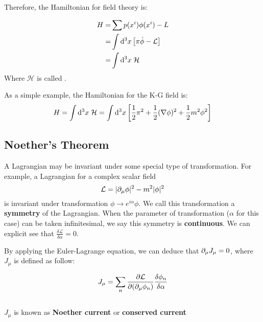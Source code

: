\documentclass[../QFTCS_note.tex]{subfiles}
\numberwithin{equation}{subsection}
\begin{document}
Therefore, the Hamiltonian for field theory is:
\begin{definition}[Hamiltonian]
  \begin{align*}
    H= & \sum p(x^i)\phi(x^i)-L                             \\
    =  & \int \mathrm{d}^3x\left[\pi \dot{\phi}-\mathcal{L}\right] \\
    =  & \int \mathrm{d}^3x\;\mathcal{H}
  \end{align*}
  Where \(\mathcal{H}\) is called .
\end{definition}

\begin{example}
  As a simple example, the Hamiltonian for the K-G field is:
  \[H=\int\mathrm{d}^3x\;\mathcal{H}=\int\mathrm{d}^3x\left[\frac{1}{2}\pi^2+\frac{1}{2}(\nabla\phi)^2+\frac{1}{2}m^2\phi^2\right]\]
\end{example}

\subsection{Noether's Theorem}
A Lagrangian may be invariant under some special type of transformation.
For example, a Lagrangian for a complex scalar field
\[\mathcal{L}= |\partial_\mu \phi|^2 -m^2|\phi|^2\]
is invariant under transformation \(\phi \rightarrow e^{i\alpha}\phi\).
We call this transformation a \textbf{symmetry} of the Lagrangian.
When the parameter of transformation (\(\alpha\) for this case) can be taken infinitesimal,
we say this symmetry is \textbf{continuous}.
We can explicit see that \(\frac{\delta \mathcal{L}}{\delta \alpha}=0\).
\par By applying the Euler-Lagrange equation, we can deduce that \(\partial_\mu J_{\mu}=0\),
where \(J_{\mu}\) is defined as follow:
\begin{definition}
  \[J_{\mu}= \sum_n\frac{\partial \mathcal{L}}{\partial(\partial_\mu \phi_n)}\frac{\delta\phi_n}{\delta \alpha}\]\\
  \(J_{\mu}\) is known as \textbf{Noether current} or \textbf{conserved current}
\end{definition}
\end{document}
